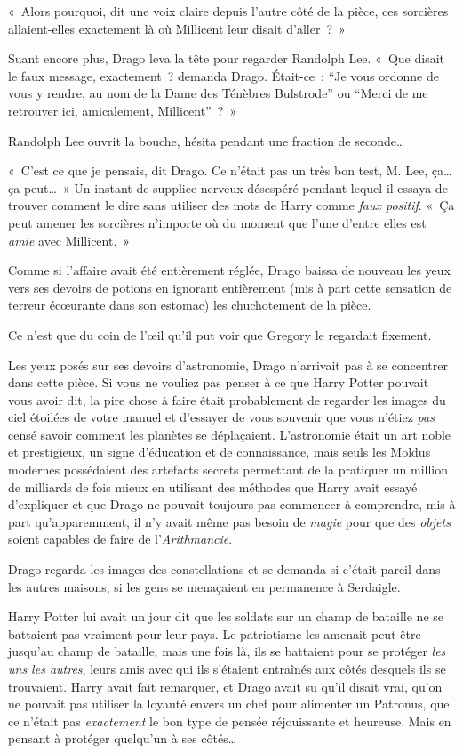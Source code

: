 «~Alors pourquoi, dit une voix claire depuis l'autre côté de la pièce, ces sorcières allaient-elles exactement là où Millicent leur disait d'aller~?~»

Suant encore plus, Drago leva la tête pour regarder Randolph Lee. «~Que disait le faux message, exactement~? demanda Drago. Était-ce~: “Je vous ordonne de vous y rendre, au nom de la Dame des Ténèbres Bulstrode” ou “Merci de me retrouver ici, amicalement, Millicent”~?~»

Randolph Lee ouvrit la bouche, hésita pendant une fraction de seconde…

«~C'est ce que je pensais, dit Drago. Ce n'était pas un très bon test, M. Lee, ça… ça peut…~» Un instant de supplice nerveux désespéré pendant lequel il essaya de trouver comment le dire sans utiliser des mots de Harry comme \emph{faux positif}. «~Ça peut amener les sorcières n'importe où du moment que l'une d'entre elles est \emph{amie} avec Millicent.~»

Comme si l'affaire avait été entièrement réglée, Drago baissa de nouveau les yeux vers ses devoirs de potions en ignorant entièrement (mis à part cette sensation de terreur écœurante dans son estomac) les chuchotement de la pièce.

Ce n'est que du coin de l'œil qu'il put voir que Gregory le regardait fixement.

\later

Les yeux posés sur ses devoirs d'astronomie, Drago n'arrivait pas à se concentrer dans cette pièce. Si vous ne vouliez pas penser à ce que Harry Potter pouvait vous avoir dit, la pire chose à faire était probablement de regarder les images du ciel étoilées de votre manuel et d'essayer de vous souvenir que vous n'étiez \emph{pas} censé savoir comment les planètes se déplaçaient. L'astronomie était un art noble et prestigieux, un signe d'éducation et de connaissance, mais seuls les Moldus modernes possédaient des artefacts secrets permettant de la pratiquer un million de milliards de fois mieux en utilisant des méthodes que Harry avait essayé d'expliquer et que Drago ne pouvait toujours pas commencer à comprendre, mis à part qu'apparemment, il n'y avait même pas besoin de \emph{magie} pour que des \emph{objets} soient capables de faire de l'\emph{Arithmancie}.

Drago regarda les images des constellations et se demanda si c'était pareil dans les autres maisons, si les gens se menaçaient en permanence à Serdaigle.

Harry Potter lui avait un jour dit que les soldats sur un champ de bataille ne se battaient pas vraiment pour leur pays. Le patriotisme les amenait peut-être jusqu'au champ de bataille, mais une fois là, ils se battaient pour se protéger \emph{les uns les autres}, leurs amis avec qui ils s'étaient entraînés aux côtés desquels ils se trouvaient. Harry avait fait remarquer, et Drago avait su qu'il disait vrai, qu'on ne pouvait pas utiliser la loyauté envers un chef pour alimenter un Patronus, que ce n'était pas \emph{exactement} le bon type de pensée réjouissante et heureuse. Mais en pensant à protéger quelqu'un à ses côtés…

